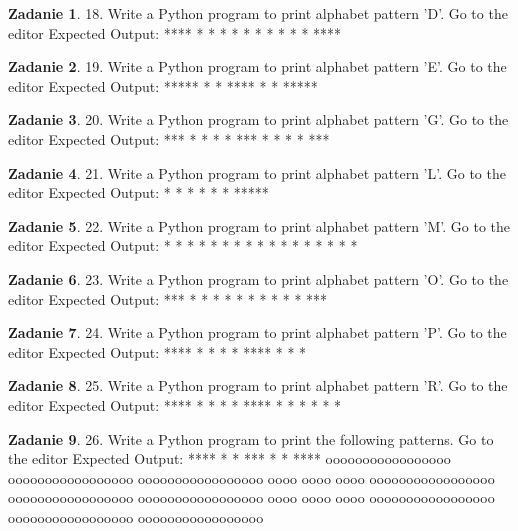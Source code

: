 \documentclass[11pt]{article}
\theoremstyle{definition}
\newtheorem{zadanie}{Zadanie}
\begin{document}
\begin{zadanie}
18. Write a Python program to print alphabet pattern 'D'. Go to the editor
Expected Output:
****
*   *
*   *
*   *
*   *
*   *
****
\end{zadanie}

\begin{zadanie}
19. Write a Python program to print alphabet pattern 'E'. Go to the editor
Expected Output:
*****
*
*
****
*
*
*****
\end{zadanie}

\begin{zadanie}
20. Write a Python program to print alphabet pattern 'G'. Go to the editor
Expected Output:
***
*   *
*
* ***
*   *
*   *
***
\end{zadanie}

\begin{zadanie}
21. Write a Python program to print alphabet pattern 'L'. Go to the editor
Expected Output:
*
*
*
*
*
*
*****
\end{zadanie}

\begin{zadanie}
22. Write a Python program to print alphabet pattern 'M'. Go to the editor
Expected Output:
*       *
*       *
* *   * *
*   *   *
*       *
*       *
*       *
\end{zadanie}

\begin{zadanie}
23. Write a Python program to print alphabet pattern 'O'. Go to the editor
Expected Output:
***
*   *
*   *
*   *
*   *
*   *
***
\end{zadanie}

\begin{zadanie}
24. Write a Python program to print alphabet pattern 'P'. Go to the editor
Expected Output:
****
*   *
*   *
****
*
*
*
\end{zadanie}

\begin{zadanie}
25. Write a Python program to print alphabet pattern 'R'. Go to the editor
Expected Output:
****
*   *
*   *
****
* *
*  *
*   *
\end{zadanie}

\begin{zadanie}
26. Write a Python program to print the following patterns. Go to the editor
Expected Output:
****
*
*
***
*
*
****
ooooooooooooooooo
ooooooooooooooooo
ooooooooooooooooo
oooo
oooo
oooo
ooooooooooooooooo
ooooooooooooooooo
ooooooooooooooooo
oooo
oooo
oooo
ooooooooooooooooo
ooooooooooooooooo
ooooooooooooooooo
\end{zadanie}
\end{document}
